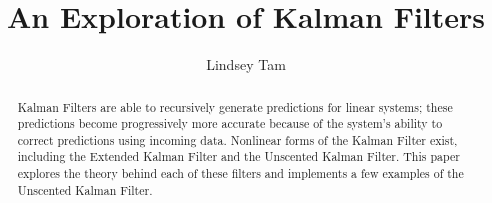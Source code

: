 \documentclass{pom_thesis}
\title{An Exploration of Kalman Filters}
\author{Lindsey Tam }
\begin{document}
\maketitle

\begin{abstract}
	Kalman Filters are able to recursively generate predictions for linear systems; these predictions become progressively more accurate because of the system's ability to correct predictions using incoming data. Nonlinear forms of the Kalman Filter exist, including the Extended Kalman Filter and the Unscented Kalman Filter. This paper explores the theory behind each of these filters and implements a few examples of the Unscented Kalman Filter.
\end{abstract}

\tableofcontents












%

\newpage






\appendix

\end{document}
